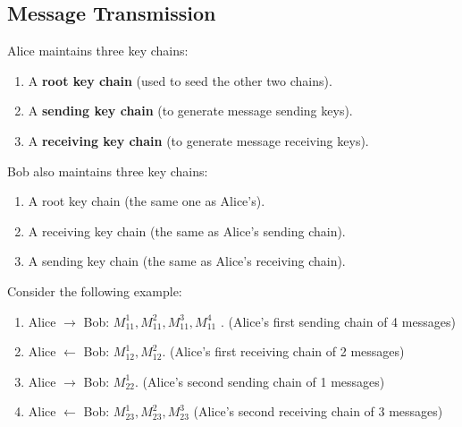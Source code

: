 \documentclass[12pt,titlepage]{article}
\begin{document}
\subsection{Message Transmission}
Alice maintains three key chains:\begin{enumerate}
	\item A \textbf{root key chain} (used to seed the other two chains).
	\item A \textbf{sending key chain} (to generate message sending keys).
	\item A \textbf{receiving key chain} (to generate message receiving keys).
\end{enumerate}
Bob also maintains three key chains:\begin{enumerate}
	\item A root key chain (the same one as Alice’s).
	\item A receiving key chain (the same as Alice’s sending chain).
	\item A sending key chain (the same as Alice’s receiving chain).
\end{enumerate}

Consider the following example:\begin{enumerate}
	\item Alice $\rightarrow$ Bob: $M_{11}^1, M_{11}^2, M_{11}^3, M_{11}^4$ . (Alice’s first sending chain of 4 messages)
	\item Alice $\leftarrow$ Bob: $M_{12}^1, M_{12}^2$. (Alice’s first receiving chain of 2 messages)
	\item Alice $\rightarrow$ Bob: $M_{22}^1$. (Alice’s second sending chain of 1 messages)
	\item Alice $\leftarrow$ Bob: $M_{23}^1, M_{23}^2, M_{23}^3$ (Alice’s second receiving chain of 3 messages)
\end{enumerate}
\end{document}
